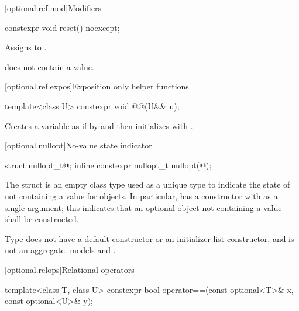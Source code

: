 [optional.ref.mod]{Modifiers}

%
\begin{itemdecl}
constexpr void reset() noexcept;
\end{itemdecl}

\begin{itemdescr}
\pnum
\effects
Assigns  to .

\pnum
\ensures
{} does not contain a value.
\end{itemdescr}

[optional.ref.expos]{Exposition only helper functions}

%
\begin{itemdecl}
template<class U>
  constexpr void @@(U&& u);
\end{itemdecl}

\begin{itemdescr}
\pnum
\effects
Creates a variable  as if by  and then initializes  with .
\end{itemdescr}

[optional.nullopt]{No-value state indicator}

%
\begin{itemdecl}
struct nullopt_t{@\seebelow@};
inline constexpr nullopt_t nullopt(@\unspec@);
\end{itemdecl}

\begin{itemdescr}
\pnum
The struct  is an empty class type used as a unique type to indicate the state of not containing a value for  objects. In particular,  has a constructor with  as a single argument; this indicates that an optional object not containing a value shall be constructed.

\pnum
Type  does not have a default constructor or an initializer-list constructor, and is not an aggregate.  models  and .
\end{itemdescr}

[optional.relops]{Relational operators}

%
\begin{itemdecl}
template<class T, class U>
  constexpr bool operator==(const optional<T>& x, const optional<U>& y);
\end{itemdecl}

